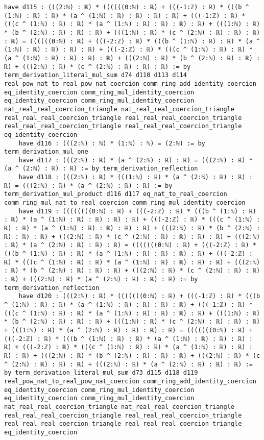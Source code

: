 \documentclass{article}
\begin{document}
\begin{tcolorbox}[colback=white!10, width=\linewidth]
\begin{lstlisting}[language=Lean4]
    have d115 : (((2:ℕ) : ℝ) * ((((((0:ℕ) : ℝ) + (((-1:ℤ) : ℝ) * (((b ^ (1:ℕ) : ℝ) : ℝ) * (a ^ (1:ℕ) : ℝ) : ℝ) : ℝ) : ℝ) + (((-1:ℤ) : ℝ) * (((c ^ (1:ℕ) : ℝ) : ℝ) * (a ^ (1:ℕ) : ℝ) : ℝ) : ℝ) : ℝ) + (((1:ℕ) : ℝ) * (b ^ (2:ℕ) : ℝ) : ℝ) : ℝ) + (((1:ℕ) : ℝ) * (c ^ (2:ℕ) : ℝ) : ℝ) : ℝ) : ℝ) = ((((((0:ℕ) : ℝ) + (((-2:ℤ) : ℝ) * (((b ^ (1:ℕ) : ℝ) : ℝ) * (a ^ (1:ℕ) : ℝ) : ℝ) : ℝ) : ℝ) + (((-2:ℤ) : ℝ) * (((c ^ (1:ℕ) : ℝ) : ℝ) * (a ^ (1:ℕ) : ℝ) : ℝ) : ℝ) : ℝ) + (((2:ℕ) : ℝ) * (b ^ (2:ℕ) : ℝ) : ℝ) : ℝ) + (((2:ℕ) : ℝ) * (c ^ (2:ℕ) : ℝ) : ℝ) : ℝ) := by term_derivation_literal_mul_sum d74 d110 d113 d114 real_pow_nat_to_real_pow_nat_coercion comm_ring_add_identity_coercion eq_identity_coercion comm_ring_mul_identity_coercion eq_identity_coercion comm_ring_mul_identity_coercion nat_real_real_coercion_triangle nat_real_real_coercion_triangle real_real_real_coercion_triangle real_real_real_coercion_triangle real_real_real_coercion_triangle real_real_real_coercion_triangle eq_identity_coercion
    have d116 : (((2:ℕ) : ℕ) * (1:ℕ) : ℕ) = (2:ℕ) := by term_derivation_mul_one
    have d117 : (((2:ℕ) : ℝ) * (a ^ (2:ℕ) : ℝ) : ℝ) = (((2:ℕ) : ℝ) * (a ^ (2:ℕ) : ℝ) : ℝ) := by term_derivation_reflection
    have d118 : (((2:ℕ) : ℝ) * (((1:ℕ) : ℝ) * (a ^ (2:ℕ) : ℝ) : ℝ) : ℝ) = (((2:ℕ) : ℝ) * (a ^ (2:ℕ) : ℝ) : ℝ) := by term_derivation_mul_product d116 d117 eq_nat_to_real_coercion comm_ring_mul_nat_to_real_coercion comm_ring_mul_identity_coercion
    have d119 : ((((((((0:ℕ) : ℝ) + (((-2:ℤ) : ℝ) * (((b ^ (1:ℕ) : ℝ) : ℝ) * (a ^ (1:ℕ) : ℝ) : ℝ) : ℝ) : ℝ) + (((-2:ℤ) : ℝ) * (((c ^ (1:ℕ) : ℝ) : ℝ) * (a ^ (1:ℕ) : ℝ) : ℝ) : ℝ) : ℝ) + (((2:ℕ) : ℝ) * (b ^ (2:ℕ) : ℝ) : ℝ) : ℝ) + (((2:ℕ) : ℝ) * (c ^ (2:ℕ) : ℝ) : ℝ) : ℝ) : ℝ) + (((2:ℕ) : ℝ) * (a ^ (2:ℕ) : ℝ) : ℝ) : ℝ) = (((((((0:ℕ) : ℝ) + (((-2:ℤ) : ℝ) * (((b ^ (1:ℕ) : ℝ) : ℝ) * (a ^ (1:ℕ) : ℝ) : ℝ) : ℝ) : ℝ) + (((-2:ℤ) : ℝ) * (((c ^ (1:ℕ) : ℝ) : ℝ) * (a ^ (1:ℕ) : ℝ) : ℝ) : ℝ) : ℝ) + (((2:ℕ) : ℝ) * (b ^ (2:ℕ) : ℝ) : ℝ) : ℝ) + (((2:ℕ) : ℝ) * (c ^ (2:ℕ) : ℝ) : ℝ) : ℝ) + (((2:ℕ) : ℝ) * (a ^ (2:ℕ) : ℝ) : ℝ) : ℝ) := by term_derivation_reflection
    have d120 : (((2:ℕ) : ℝ) * (((((((0:ℕ) : ℝ) + (((-1:ℤ) : ℝ) * (((b ^ (1:ℕ) : ℝ) : ℝ) * (a ^ (1:ℕ) : ℝ) : ℝ) : ℝ) : ℝ) + (((-1:ℤ) : ℝ) * (((c ^ (1:ℕ) : ℝ) : ℝ) * (a ^ (1:ℕ) : ℝ) : ℝ) : ℝ) : ℝ) + (((1:ℕ) : ℝ) * (b ^ (2:ℕ) : ℝ) : ℝ) : ℝ) + (((1:ℕ) : ℝ) * (c ^ (2:ℕ) : ℝ) : ℝ) : ℝ) + (((1:ℕ) : ℝ) * (a ^ (2:ℕ) : ℝ) : ℝ) : ℝ) : ℝ) = (((((((0:ℕ) : ℝ) + (((-2:ℤ) : ℝ) * (((b ^ (1:ℕ) : ℝ) : ℝ) * (a ^ (1:ℕ) : ℝ) : ℝ) : ℝ) : ℝ) + (((-2:ℤ) : ℝ) * (((c ^ (1:ℕ) : ℝ) : ℝ) * (a ^ (1:ℕ) : ℝ) : ℝ) : ℝ) : ℝ) + (((2:ℕ) : ℝ) * (b ^ (2:ℕ) : ℝ) : ℝ) : ℝ) + (((2:ℕ) : ℝ) * (c ^ (2:ℕ) : ℝ) : ℝ) : ℝ) + (((2:ℕ) : ℝ) * (a ^ (2:ℕ) : ℝ) : ℝ) : ℝ) := by term_derivation_literal_mul_sum d73 d115 d118 d119 real_pow_nat_to_real_pow_nat_coercion comm_ring_add_identity_coercion eq_identity_coercion comm_ring_mul_identity_coercion eq_identity_coercion comm_ring_mul_identity_coercion nat_real_real_coercion_triangle nat_real_real_coercion_triangle real_real_real_coercion_triangle real_real_real_coercion_triangle real_real_real_coercion_triangle real_real_real_coercion_triangle eq_identity_coercion

\end{lstlisting}
\end{tcolorbox}
\end{document}
